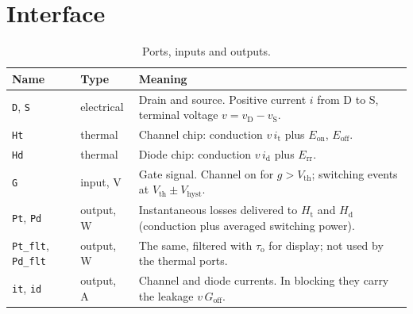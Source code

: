 \documentclass[11pt,a4paper]{article}
\newcommand{\Eon}{E_{\mathrm{on}}}
\newcommand{\Eoff}{E_{\mathrm{off}}}
\newcommand{\Err}{E_{\mathrm{rr}}}
\newcommand{\Ht}{H_{\mathrm{t}}}
\newcommand{\Hd}{H_{\mathrm{d}}}
\newcommand{\tauo}{\tau_{\mathrm{o}}}
\newcommand{\code}[1]{\texttt{#1}}
\begin{document}
\section{Interface}

\begin{table}[htbp]
\centering
\caption{Ports, inputs and outputs.}
\label{tab:ports}
\begin{tabularx}{\textwidth}{@{}llX@{}}
\toprule
Name & Type & Meaning \\
\midrule
\code{D}, \code{S} & electrical & Drain and source. Positive current $i$ from D to S, terminal voltage $v = v_\mathrm{D} - v_\mathrm{S}$. \\
\code{Ht} & thermal & Channel chip: conduction $v\,i_\mathrm{t}$ plus $\Eon$, $\Eoff$. \\
\code{Hd} & thermal & Diode chip: conduction $v\,i_\mathrm{d}$ plus $\Err$. \\
\code{G} & input, \si{\volt} & Gate signal. Channel on for $g > V_\mathrm{th}$; switching events at $V_\mathrm{th} \pm V_\mathrm{hyst}$. \\
\code{Pt}, \code{Pd} & output, \si{\watt} & Instantaneous losses delivered to $\Ht$ and $\Hd$ (conduction plus averaged switching power). \\
\code{Pt\_flt}, \code{Pd\_flt} & output, \si{\watt} & The same, filtered with $\tauo$ for display; not used by the thermal ports. \\
\code{it}, \code{id} & output, \si{\ampere} & Channel and diode currents. In blocking they carry the leakage $v\,G_\mathrm{off}$. \\
\bottomrule
\end{tabularx}
\end{table}
\end{document}
